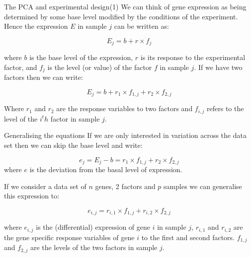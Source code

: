 \documentclass[pdf]{beamer}
\begin{document}
\begin{frame}[fragile]{The PCA and experimental design(1)}
  \small
  We can think of gene expression as being determined by some base level
  modified by the conditions of the experiment. Hence the expression $E$ in
  sample $j$ can be written as:

  $$
  E_j = b + r\times f_j
  $$
  
  \small
  where $b$ is the base level of the expression, $r$ is its response to the
  experimental factor, and $f_j$ is the level (or value) of the factor $f$ in
  sample $j$. If we have two factors then we can write:
  
  $$
  E_j = b + r_1\times f_{1,j} + r_2\times f_{2,j}
  $$

  \small Where $r_1$ and $r_2$ are the response variables to two factors and
  $f_{i,j}$ refers to the level of the $i^th$ factor in sample $j$.

\end{frame}

\begin{frame}[fragile]{Generalising the equations}
  \small
  If we are only interested in variation across the data set then we can skip
  the base level and write:
  
  $$
  e_j = E_j - b = r_1\times f_{1,j} + r_2\times f_{2,j}
  $$
  \small where $e$ is the deviation from the basal level of expression.

  \small If we consider a data set of $n$ genes, 2 factors and $p$ samples we can
  generalise this expression to:

  $$
  e_{i,j} = r_{i,1}\times f_{1,j} + r_{i,2}\times f_{2,j}
  $$

  \small where $e_{i,j}$ is the (differential) expression of gene $i$ in
  sample $j$, $r_{i,1}$ and $r_{i,2}$ are the gene specific response variables
  of gene $i$ to the first and second factors. $f_{1,j}$ and $f_{2,j}$ are the
  levels of the two factors in sample $j$.

\end{frame}
\end{document}
